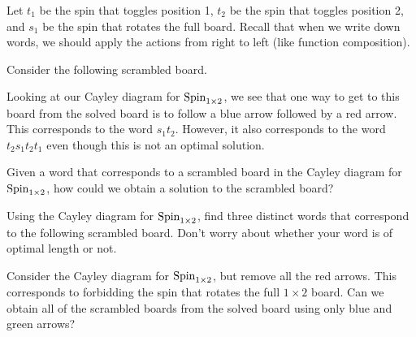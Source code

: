 Let \(t_1\) be the spin that toggles position 1, \(t_2\) be the spin that toggles position 2, and \(s_1\) be the spin that rotates the full board.  Recall that when we write down words, we should apply the actions from right to left (like function composition).  

Consider the following scrambled board.

\begin{center}
\end{center}

\noindent Looking at our Cayley diagram for \(\operatorname{Spin}_{1\times 2}\), we see that one way to get to this board from the solved board is to follow a blue arrow followed by a red arrow.  This corresponds to the word \(s_1t_2\).  However, it also corresponds to the word \(t_2s_1t_2t_1\) even though this is not an optimal solution.

\begin{exercise}
Given a word that corresponds to a scrambled board in the Cayley diagram for \(\operatorname{Spin}_{1\times 2}\), how could we obtain a solution to the scrambled board?
\end{exercise}

\begin{exercise}
Using the Cayley diagram for \(\operatorname{Spin}_{1\times 2}\), find three distinct words that correspond to the following scrambled board.  Don't worry about whether your word is of optimal length or not.

\begin{center}
\end{center}
\end{exercise}

\begin{exercise}
Consider the Cayley diagram for \(\operatorname{Spin}_{1\times 2}\), but remove all the red arrows.  This corresponds to forbidding the spin that rotates the full \(1\times 2\) board.  Can we obtain all of the scrambled boards from the solved board using only blue and green arrows?
\end{exercise}

